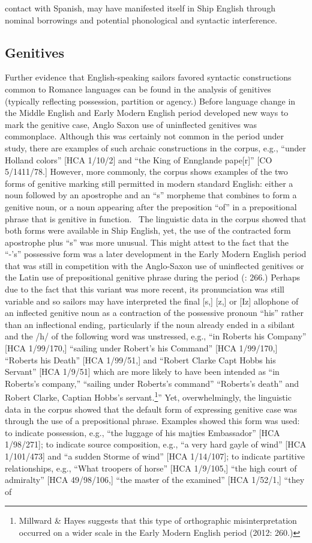 contact with Spanish, may have manifested itself in Ship English through nominal borrowings and potential phonological and syntactic interference. ~

\subsection{{Genitives}}%

   Further evidence that English-speaking sailors favored syntactic constructions common to Romance languages can be found in the analysis of genitives (typically reflecting possession, partition or agency.) Before language change in the Middle English and Early Modern English period developed new ways to mark the genitive case, Anglo Saxon use of uninflected genitives was commonplace. Although this was certainly not common in the period under study, there are examples of such archaic constructions in the corpus, e.g., “under Holland colors” [HCA 1/10/2] and “the King of Ennglande pape[r]” [CO 5/1411/78.] However, more commonly, the corpus shows examples of the two forms of genitive marking still permitted in modern standard English: either a noun followed by an apostrophe and an “s” morpheme that combines to form a genitive noun, or a noun appearing after the preposition “of” in a prepositional phrase that is genitive in function. ~The linguistic data in the corpus showed that both forms were available in Ship English, yet, the use of the contracted form apostrophe plus “s” was more unusual. This might attest to the fact that the “-’s” possessive form was a later development in the Early Modern English period that was still in competition with the Anglo-Saxon use of uninflected genitives or the Latin use of prepositional genitive phrase during the period (\citealt{Milward1996}: 266.) Perhaps due to the fact that this variant was more recent, its pronunciation was still variable and so sailors may have interpreted the final [s,] [z,] or [Iz] allophone of an inflected genitive noun as a contraction of the possessive pronoun “his” rather than an inflectional ending, particularly if the noun already ended in a sibilant and the /h/ of the following word was unstressed, e.g., “in Roberts his Company” [HCA 1/99/170,] “sailing under Robert’s his Command” [HCA 1/99/170,] “Roberts his Death” [HCA 1/99/51,] and “Robert Clarke Capt Hobbs his Servant” [HCA 1/9/51] which are more likely to have been intended as “in Roberts’s company,” “sailing under Roberts’s command” “Roberts’s death” and Robert Clarke, Captian Hobbs’s servant.\footnote{Millward \& Hayes suggests that this type of orthographic misinterpretation occurred on a wider scale in the Early Modern English period (2012: 260.)}” Yet, overwhelmingly, the linguistic data in the corpus showed that the default form of expressing genitive case was through the use of a prepositional phrase. Examples showed this form was used: to indicate possession, e.g., “the luggage of his majties Embassador” [HCA 1/98/271]; to indicate source composition, e.g., “a very hard gayle of wind” [HCA 1/101/473] and “a sudden Storme of wind” [HCA 1/14/107]; to indicate partitive relationships, e.g., “What troopers of horse” [HCA 1/9/105,] “the high court of admiralty” [HCA 49/98/106,] “the master of the examined” [HCA 1/52/1,] “they of 